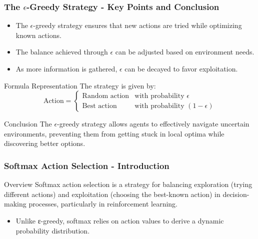 \documentclass[aspectratio=169]{beamer}
\begin{document}
\begin{frame}[fragile]
    \frametitle{The $\epsilon$-Greedy Strategy - Key Points and Conclusion}
    \begin{itemize}
        \item The $\epsilon$-greedy strategy ensures that new actions are tried while optimizing known actions.
        \item The balance achieved through $\epsilon$ can be adjusted based on environment needs.
        \item As more information is gathered, $\epsilon$ can be decayed to favor exploitation.
    \end{itemize}
    
    \begin{block}{Formula Representation}
        The strategy is given by:
        \begin{equation}
        \text{Action} = 
        \begin{cases} 
            \text{Random action} & \text{with probability } \epsilon \\
            \text{Best action} & \text{with probability } (1 - \epsilon)
        \end{cases}
        \end{equation}
    \end{block}

    \begin{block}{Conclusion}
        The $\epsilon$-greedy strategy allows agents to effectively navigate uncertain environments, preventing them from getting stuck in local optima while discovering better options.
    \end{block}
\end{frame}

\begin{frame}[fragile]
    \frametitle{Softmax Action Selection - Introduction}
    \begin{block}{Overview}
        Softmax action selection is a strategy for balancing exploration (trying different actions) and exploitation (choosing the best-known action) in decision-making processes, particularly in reinforcement learning.
        \begin{itemize}
            \item Unlike ε-greedy, softmax relies on action values to derive a dynamic probability distribution.
        \end{itemize}
    \end{block}
\end{frame}
\end{document}
